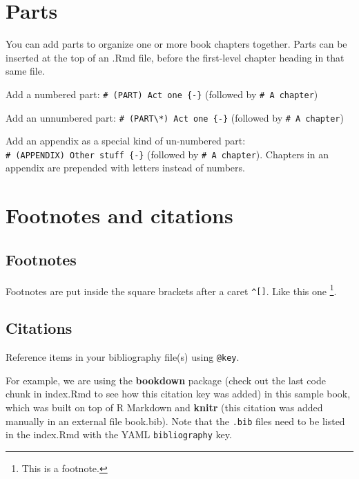 \documentclass[
]{book}
\theoremstyle{definition}
\theoremstyle{definition}
\theoremstyle{definition}
\theoremstyle{definition}
\theoremstyle{remark}
\begin{document}
\hypertarget{parts}{%
\chapter{Parts}\label{parts}}

You can add parts to organize one or more book chapters together. Parts can be inserted at the top of an .Rmd file, before the first-level chapter heading in that same file.

Add a numbered part: \texttt{\#\ (PART)\ Act\ one\ \{-\}} (followed by \texttt{\#\ A\ chapter})

Add an unnumbered part: \texttt{\#\ (PART\textbackslash{}*)\ Act\ one\ \{-\}} (followed by \texttt{\#\ A\ chapter})

Add an appendix as a special kind of un-numbered part: \texttt{\#\ (APPENDIX)\ Other\ stuff\ \{-\}} (followed by \texttt{\#\ A\ chapter}). Chapters in an appendix are prepended with letters instead of numbers.

\hypertarget{footnotes-and-citations}{%
\chapter{Footnotes and citations}\label{footnotes-and-citations}}

\hypertarget{footnotes}{%
\section{Footnotes}\label{footnotes}}

Footnotes are put inside the square brackets after a caret \texttt{\^{}{[}{]}}. Like this one \footnote{This is a footnote.}.

\hypertarget{citations}{%
\section{Citations}\label{citations}}

Reference items in your bibliography file(s) using \texttt{@key}.

For example, we are using the \textbf{bookdown} package \citep{R-bookdown} (check out the last code chunk in index.Rmd to see how this citation key was added) in this sample book, which was built on top of R Markdown and \textbf{knitr} \citep{xie_dynamic_2015} (this citation was added manually in an external file book.bib). Note that the \texttt{.bib} files need to be listed in the index.Rmd with the YAML \texttt{bibliography} key.
\end{document}
